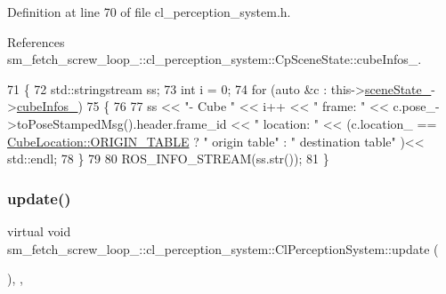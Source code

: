 Definition at line 70 of file cl\+\_\+perception\+\_\+system.\+h.



References sm\+\_\+fetch\+\_\+screw\+\_\+loop\+\_\+::cl\+\_\+perception\+\_\+system\+::\+Cp\+Scene\+State\+::cube\+Infos\+\_\+.


\begin{DoxyCode}
71             \{
72                 std::stringstream ss;
73                 \textcolor{keywordtype}{int} i = 0;
74                 \textcolor{keywordflow}{for} (\textcolor{keyword}{auto} &c : this->\hyperlink{classsm__fetch__screw__loop__1_1_1cl__perception__system_1_1ClPerceptionSystem_a2a9472fe3838543666bd2eea5df0f2e6}{sceneState\_}->\hyperlink{classsm__fetch__screw__loop__1_1_1cl__perception__system_1_1CpSceneState_a518bc2132bcc8e88152549db120d7d29}{cubeInfos\_})
75                 \{
76 
77                     ss << \textcolor{stringliteral}{"- Cube "} << i++ << \textcolor{stringliteral}{" frame: "} << c.pose\_->toPoseStampedMsg().header.frame\_id << \textcolor{stringliteral}{
      " location: "} << (c.location\_ == \hyperlink{namespacesm__fetch__screw__loop__1_1_1cl__perception__system_a8cdb75a4100a10a4a1c6034d9655088dae5ee34c3ef8ec4a46a00a218416c7b1d}{CubeLocation::ORIGIN\_TABLE} ? \textcolor{stringliteral}{" origin table"} : \textcolor{stringliteral}{"
       destination table"} )<< std::endl;
78                 \}
79 
80                 ROS\_INFO\_STREAM(ss.str());
81             \}
\end{DoxyCode}
\mbox{\label{classsm__fetch__screw__loop__1_1_1cl__perception__system_1_1ClPerceptionSystem_a099122cff1991d93c82cf07af05395f3}} 
\subsubsection{\texorpdfstring{update()}{update()}}
{\footnotesize\ttfamily virtual void sm\+\_\+fetch\+\_\+screw\+\_\+loop\+\_\+::cl\+\_\+perception\+\_\+system\+::\+Cl\+Perception\+System\+::update (\begin{DoxyParamCaption}{ }\end{DoxyParamCaption})\hspace{0.3cm}{\ttfamily [inline]}, {\ttfamily [override]}, {\ttfamily [virtual]}}



